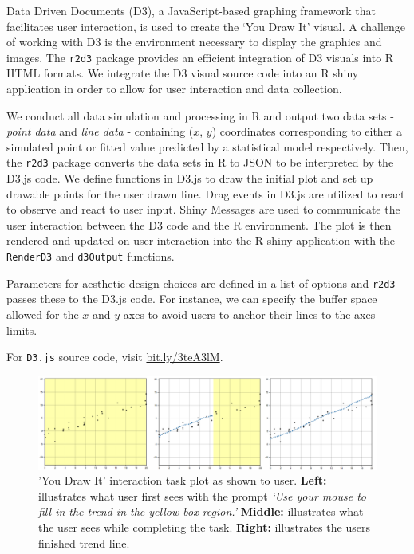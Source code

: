 \documentclass[12pt]{article}
\begin{document}
Data Driven Documents (D3), a JavaScript-based graphing framework that
facilitates user interaction, is used to create the `You Draw It'
visual. A challenge of working with D3 is the environment necessary to
display the graphics and images. The \texttt{r2d3} package
\citep{r2d3pkg} provides an efficient integration of D3 visuals into R
HTML formats. We integrate the D3 visual source code into an R shiny
\citep{shinypkg} application in order to allow for user interaction and
data collection.

We conduct all data simulation and processing in R and output two data
sets - \emph{point data} and \emph{line data} - containing (\(x\),
\(y\)) coordinates corresponding to either a simulated point or fitted
value predicted by a statistical model respectively. Then, the
\texttt{r2d3} package converts the data sets in R to JSON to be
interpreted by the D3.js code. We define functions in D3.js to draw the
initial plot and set up drawable points for the user drawn line. Drag
events in D3.js are utilized to react to observe and react to user
input. Shiny Messages are used to communicate the user interaction
between the D3 code and the R environment. The plot is then rendered and
updated on user interaction into the R shiny application with the
\texttt{RenderD3} and \texttt{d3Output} functions.

Parameters for aesthetic design choices are defined in a list of options
and \texttt{r2d3} passes these to the D3.js code. For instance, we can
specify the buffer space allowed for the \(x\) and \(y\) axes to avoid
users to anchor their lines to the axes limits.

For \texttt{D3.js} source code, visit
\href{https://bit.ly/3teA3lM}{bit.ly/3teA3lM}.

\begin{figure}

{\centering \includegraphics[width=1\linewidth]{images/ydi-stimuli} 

}

\caption{'You Draw It' interaction task plot as shown to user. \textbf{Left:} illustrates what user first sees with the prompt \textit{`Use your mouse to fill in the trend in the yellow box region.'} \textbf{Middle:} illustrates what the user sees while completing the task. \textbf{Right:} illustrates the users finished trend line.}\label{fig:you-draw-it-example}
\end{figure}
\end{document}
